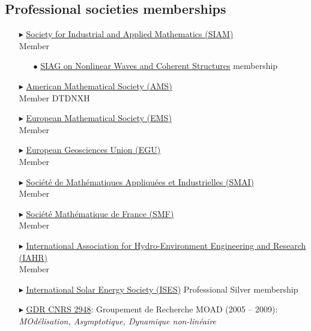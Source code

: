     \subsection{Professional societies memberships}
    \begin{itemize}
        \item[$\blacktriangleright$] \href{https://www.siam.org/}{Society for Industrial and Applied Mathematics (SIAM)}\\
            Member 
        \begin{itemize}
            \item[$\bullet$] \href{https://www.siam.org/membership/activity-groups/detail/nonlinear-waves-and-coherent-structures/}{SIAG on Nonlinear Waves and Coherent Structures} membership
        \end{itemize}
        \item[$\blacktriangleright$] \href{https://www.ams.org/}{American Mathematical Society (AMS)}\\
            Member \No DTDNXH
        \item[$\blacktriangleright$] \href{https://euromathsoc.org/}{European Mathematical Society (EMS)}\\
            Member 
        \item[$\blacktriangleright$] \href{https://www.egu.eu/}{European Geosciences Union (EGU)}\\
            Member 
        \item[$\blacktriangleright$] \href{https://smai.emath.fr/}{Soci\'et\'e de Math\'ematiques Appliqu\'ees et Industrielles (SMAI)}\\
            Member 
        \item[$\blacktriangleright$] \href{http://smf.emath.fr}{Soci\'et\'e Math\'ematique de France (SMF)}\\
            Member 
        \item[$\blacktriangleright$] \href{https://www.iahr.org/}{International Association for Hydro-Environment Engineering and Research (IAHR)}\\
            Member 
        \item[$\blacktriangleright$] \href{https://www.ises.org/}{International Solar Energy Society (ISES)} Professional Silver membership
        \item[$\blacktriangleright$] \href{http://moad.univ-lyon1.fr/Main.php}{GDR CNRS 2948}: Groupement de Recherche MOAD (2005 -- 2009):\\
            \textit{MOd\'elisation, Asymptotique, Dynamique non-lin\'eaire}
    \end{itemize}